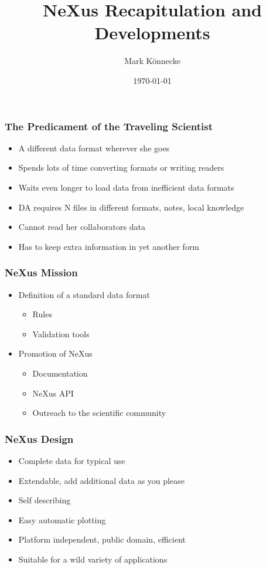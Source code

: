 \documentclass{beamer}
\title{NeXus Recapitulation and Developments}
\author{Mark K\"onnecke }
\institute{NeXus International Advisory Committee}
\date{\today}
\begin{document}
\begin{frame}
\titlepage
\end{frame}

\begin{frame}
\frametitle{The Predicament of the Traveling Scientist}
\begin{itemize}
\item<1->A different data format wherever she goes
\item<2->Spends lots of time converting formats or writing readers
\item<3->Waits even longer to load data from inefficient data formats
\item<4->DA requires N files in different  formats, notes, local knowledge 
\item<5->Cannot read her collaborators data
\item<6->Has to keep extra information in yet another form
\end{itemize}
\end{frame}

\begin{frame} \frametitle{NeXus Mission}
\begin{itemize}
\item Definition of a standard data format
\begin{itemize}
\item Rules
\item Validation tools
\end{itemize}
\item Promotion of NeXus
\begin{itemize}
\item Documentation
\item NeXus API
\item Outreach to the scientific community
\end{itemize}
\end{itemize}
\end{frame}

\begin{frame} \frametitle{NeXus Design}
\begin{itemize}
\item Complete data for typical use
\item Extendable, add additional data as you please
\item Self describing
\item Easy automatic plotting
\item Platform independent, public domain, efficient
\item Suitable for a wild variety of applications
\end{itemize}
\end{frame}
\end{document}
